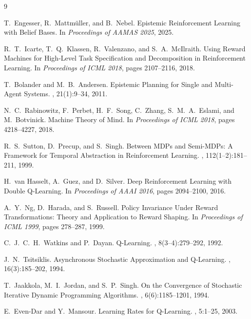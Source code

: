 \documentclass[11pt]{article}
\begin{document}
\begin{thebibliography}{9}

T.~Engesser, R.~Mattm\"{u}ller, and B.~Nebel.
\newblock Epistemic Reinforcement Learning with Belief Bases.
\newblock In {\em Proceedings of AAMAS 2025}, 2025.

R.~T.~Icarte, T.~Q.~Klassen, R.~Valenzano, and S.~A.~McIlraith.
\newblock Using Reward Machines for High-Level Task Specification and Decomposition in Reinforcement Learning.
\newblock In {\em Proceedings of ICML 2018}, pages 2107--2116, 2018.

T.~Bolander and M.~B.~Andersen.
\newblock Epistemic Planning for Single and Multi-Agent Systems.
, 21(1):9--34, 2011.

N.~C.~Rabinowitz, F.~Perbet, H.~F.~Song, C.~Zhang, S.~M.~A.~Eslami, and M.~Botvinick.
\newblock Machine Theory of Mind.
\newblock In {\em Proceedings of ICML 2018}, pages 4218--4227, 2018.

R.~S.~Sutton, D.~Precup, and S.~Singh.
\newblock Between MDPs and Semi-MDPs: A Framework for Temporal Abstraction in Reinforcement Learning.
, 112(1--2):181--211, 1999.

H.~van Hasselt, A.~Guez, and D.~Silver.
\newblock Deep Reinforcement Learning with Double Q-Learning.
\newblock In {\em Proceedings of AAAI 2016}, pages 2094--2100, 2016.

A.~Y.~Ng, D.~Harada, and S.~Russell.
\newblock Policy Invariance Under Reward Transformations: Theory and Application to Reward Shaping.
\newblock In {\em Proceedings of ICML 1999}, pages 278--287, 1999.

C.~J.~C.~H.~Watkins and P.~Dayan.
\newblock Q-Learning.
, 8(3--4):279--292, 1992.

J.~N.~Tsitsiklis.
\newblock Asynchronous Stochastic Approximation and Q-Learning.
, 16(3):185--202, 1994.

T.~Jaakkola, M.~I.~Jordan, and S.~P.~Singh.
\newblock On the Convergence of Stochastic Iterative Dynamic Programming Algorithms.
, 6(6):1185--1201, 1994.

E.~Even-Dar and Y.~Mansour.
\newblock Learning Rates for Q-Learning.
, 5:1--25, 2003.

\end{thebibliography}
\end{document}
